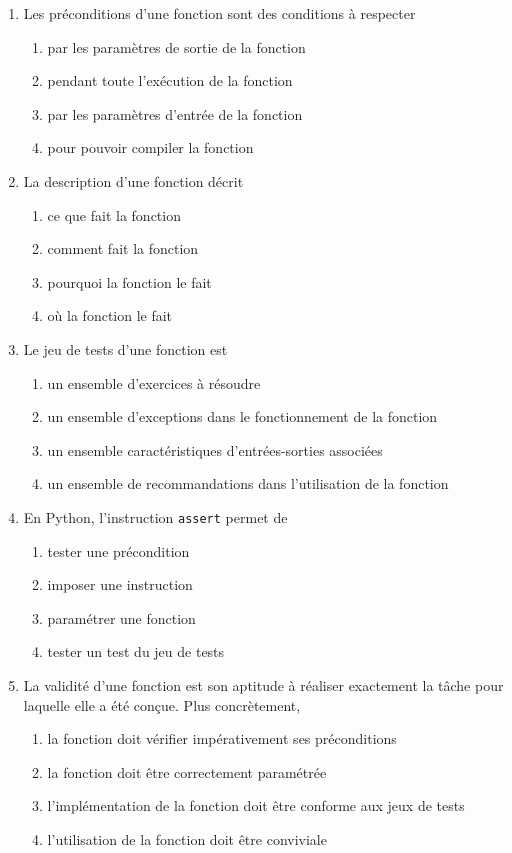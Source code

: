 \begin{td}[QCM (3)]
\begin{enumerate}
\item Les préconditions d'une fonction sont des conditions à respecter 
	\begin{enumerate}
	\item par les paramètres de sortie de la fonction
	\item pendant toute l'exécution de la fonction
	\item par les paramètres d'entrée de la fonction
	\item pour pouvoir compiler la fonction
	\end{enumerate}
	
\item La description d'une fonction décrit
	\begin{enumerate}
	\item ce que fait la fonction
	\item comment fait la fonction
	\item pourquoi la fonction le fait 
	\item où la fonction le fait
	\end{enumerate}
	
\item Le jeu de tests d'une fonction est 
	\begin{enumerate}
	\item un ensemble d'exercices à résoudre
	\item un ensemble d'exceptions dans le fonctionnement de la fonction
	\item un ensemble caractéristiques d'entrées-sorties associées
	\item un ensemble de recommandations dans l'utilisation de la fonction
	\end{enumerate}

\item En {\sc Python}, l'instruction {\tt assert} permet de 
	\begin{enumerate}
	\item tester une précondition
	\item imposer une instruction
	\item paramétrer une fonction
	\item tester un test du jeu de tests
	\end{enumerate}

\item La validité d'une fonction est son aptitude à réaliser exactement 
	la tâche pour laquelle elle a été conçue. Plus concrètement,
	\begin{enumerate}
	\item la fonction doit vérifier impérativement ses préconditions
	\item la fonction doit être correctement paramétrée
	\item l'implémentation de la fonction doit être conforme aux jeux de tests
	\item l'utilisation de la fonction doit être conviviale
	\end{enumerate}


\end{enumerate}
\end{td}
